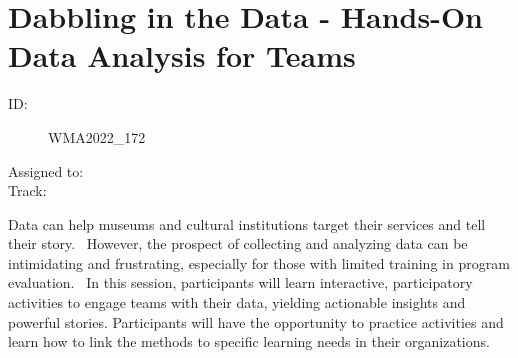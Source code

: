 \documentclass{report}
\begin{document}
      
        
        
        
          \newpage
          \section{ Dabbling in the Data - Hands-On Data Analysis for Teams }
            \begin{description}
              \item [ID:]
              WMA2022\_172

              \item [Assigned to:]
                \item [Track:]
              \end{description}

              Data can help museums and cultural institutions target their services and tell their story.  However, the prospect of collecting and analyzing data can be intimidating and frustrating, especially for those with limited training in program evaluation. 
In this session, participants will learn interactive, participatory activities to engage teams with their data, yielding actionable insights and powerful stories. Participants will have the opportunity to practice activities and learn how to link the methods to specific learning needs in their organizations.
\end{document}
